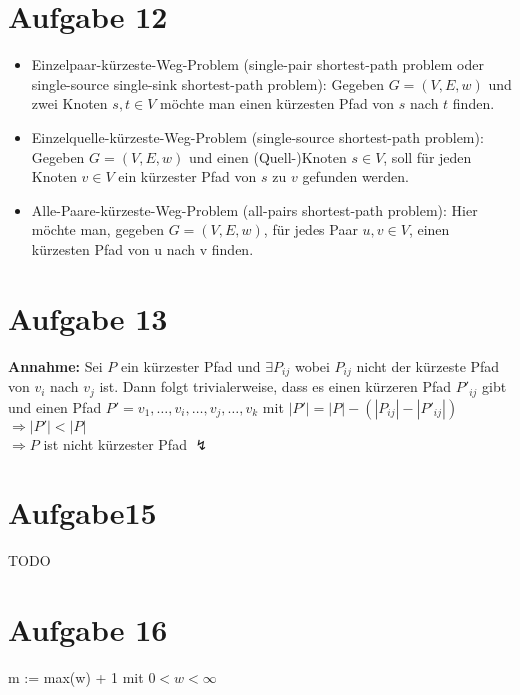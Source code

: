 \documentclass[10pt,a4paper]{article}
\begin{document}
\section*{Aufgabe 12}

    \begin{itemize}
        \item   Einzelpaar-kürzeste-Weg-Problem (single-pair shortest-path problem oder
        single-source single-sink shortest-path problem): Gegeben $G = (V, E, w)$ und zwei
        Knoten $s,t \in V$ möchte man einen kürzesten Pfad von  $s$ nach $t$ finden.
        \item Einzelquelle-kürzeste-Weg-Problem (single-source shortest-path problem):
        Gegeben $G = (V, E, w)$ und einen (Quell-)Knoten $s \in V$, soll für jeden Knoten $v \in V$
        ein kürzester Pfad von $s$ zu $v$ gefunden werden.
        \item Alle-Paare-kürzeste-Weg-Problem (all-pairs shortest-path problem): Hier möchte
		man, gegeben $G = (V, E, w)$, für jedes Paar $u,v \in V$, einen kürzesten Pfad von u nach v
		finden.
	\end{itemize}

\section*{Aufgabe 13}
    \textbf{Annahme: } Sei $P$ ein kürzester Pfad und $\exists P_{ij}$
    wobei $P_{ij}$ nicht der kürzeste Pfad von $v_i$ nach $v_j$ ist.
    Dann folgt trivialerweise, dass es einen kürzeren Pfad $P'_{ij}$ gibt
    und einen Pfad $P' = v_1, \ldots, v_i, \ldots, v_j, \ldots, v_k$ mit
    $|P'| = |P| - (|P_{ij}| - |P'_{ij}|)$ \\ $\Rightarrow |P'| < |P|$
    \\ $\Rightarrow P$ ist nicht kürzester Pfad $\lightning$
    

\section*{Aufgabe15}

    TODO

\section*{Aufgabe 16}
    
    \begin{algorithm}[H]
     
     m := max(w) + 1 mit $0 < w < \infty$\;
     
    \end{algorithm}
    
\end{document}
